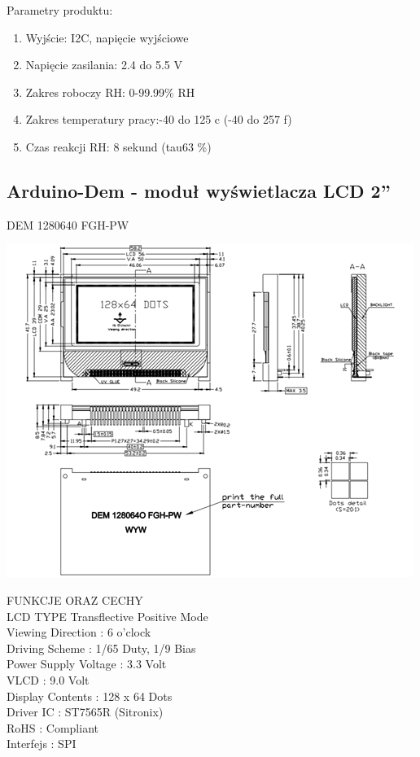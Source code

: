 \documentclass{classrep}
\begin{document}
Parametry produktu:
\begin{enumerate}
  \item Wyjście: I2C, napięcie wyjściowe
  \item Napięcie zasilania: 2.4 do 5.5 V
  \item Zakres roboczy RH: 0-99.99\% RH
  \item Zakres temperatury pracy:-40 \degree do 125 \degree c (-40 \degree do 257 \degree f)
  \item Czas reakcji RH: 8 sekund (tau63 \%)
\end{enumerate}


\subsection {Arduino-Dem - moduł wyświetlacza LCD 2''}
DEM 1280640 FGH-PW\\

\begin{center}
\includegraphics[scale=0.5]{U8G2}\\
\end{center}

FUNKCJE ORAZ CECHY\\
LCD TYPE
Transflective Positive Mode\\
Viewing Direction           : 6 o'clock\\
 Driving Scheme           : 1/65 Duty, 1/9 Bias\\
 Power Supply Voltage   : 3.3 Volt\\
 VLCD                        : 9.0 Volt\\
 Display Contents         : 128 x 64 Dots\\
 Driver IC                   : ST7565R (Sitronix)\\
 RoHS                        : Compliant\\
 Interfejs                    : SPI\\
\end{document}
